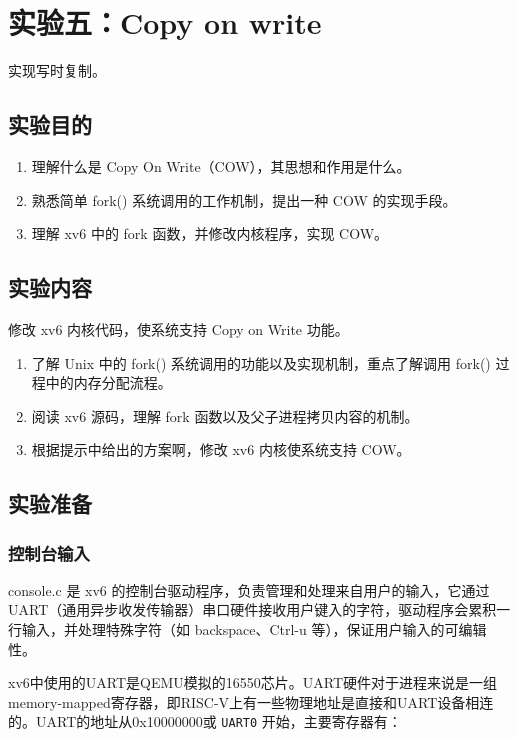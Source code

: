 \section{实验五：Copy on write}\label{sec:Copy_on_write}

实现写时复制。

\subsection{实验目的}

\begin{enumerate}
	\item 理解什么是 Copy On Write（COW），其思想和作用是什么。
	\item 熟悉简单 fork() 系统调用的工作机制，提出一种 COW 的实现手段。
	\item 理解 xv6 中的 fork 函数，并修改内核程序，实现 COW。
\end{enumerate}

\subsection{实验内容}

修改 xv6 内核代码，使系统支持 Copy on Write 功能。

\begin{enumerate}
	\item 了解 Unix 中的 fork() 系统调用的功能以及实现机制，重点了解调用 fork()
	过程中的内存分配流程。
	\item 阅读 xv6 源码，理解 fork 函数以及父子进程拷贝内容的机制。
	\item 根据提示中给出的方案啊，修改 xv6 内核使系统支持 COW。
\end{enumerate}

\subsection{实验准备}

\subsubsection{控制台输入}

console.c 是 xv6 的控制台驱动程序，负责管理和处理来自用户的输入，它通过 UART（通用异步收发传输器）串口硬件接收用户键入的字符，驱动程序会累积一行输入，并处理特殊字符（如 backspace、Ctrl-u 等），保证用户输入的可编辑性。

xv6中使用的UART是QEMU模拟的16550芯片。UART硬件对于进程来说是一组memory-mapped寄存器，即RISC-V上有一些物理地址是直接和UART设备相连的。UART的地址从0x10000000或 \texttt{UART0} 开始，主要寄存器有：

